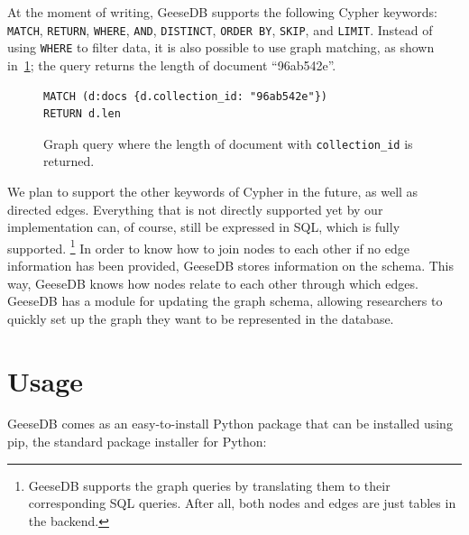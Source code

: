 At the moment of writing, GeeseDB supports the following Cypher keywords: \texttt{MATCH}, \texttt{RETURN}, \texttt{WHERE}, \texttt{AND}, \texttt{DISTINCT}, \texttt{ORDER BY}, \texttt{SKIP}, and \texttt{LIMIT}. Instead of using \texttt{WHERE} to filter data, it is also possible to use graph matching, as shown in~\cref{fig:graph_query2}; the query returns the length of document ``96ab542e''. 
\begin{figure}
	\begin{verbatim}
MATCH (d:docs {d.collection_id: "96ab542e"})
RETURN d.len
	\end{verbatim}
	\caption{Graph query where the length of document with \texttt{collection\_id} is returned.}
	\label{fig:graph_query2}
\end{figure}
We plan to support the other keywords of Cypher in the future, as well as directed edges. Everything that is not directly supported yet by our implementation can, of course, still be expressed in SQL, which is fully supported. \footnote{GeeseDB supports the graph queries by translating them to their corresponding SQL queries. After all, both nodes and edges are just tables in the backend.} In order to know how to join nodes to each other if no edge information has been provided, GeeseDB stores information on the schema. This way, GeeseDB knows how nodes relate to each other through which edges. GeeseDB has a module for updating the graph schema, allowing researchers to quickly set up the graph they want to be represented in the database.

\section{Usage}
GeeseDB comes as an easy-to-install Python package that can be installed using pip, the standard package installer for Python:

